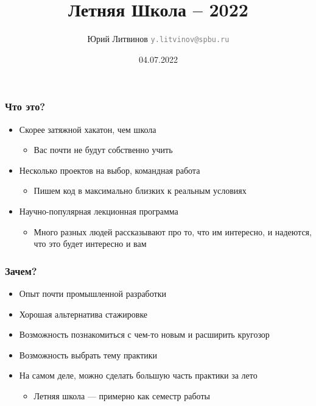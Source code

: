 \documentclass[xetex,mathserif,serif]{beamer}
\title{Летняя Школа -- 2022}
\author[Юрий Литвинов]{Юрий Литвинов \newline \textcolor{gray}{\small\texttt{y.litvinov@spbu.ru}}}
\date{04.07.2022}
\begin{document}
    \frame{\titlepage}

    \begin{frame}
        \frametitle{Что это?}
        \begin{itemize}
            \item Скорее затяжной хакатон, чем школа
            \begin{itemize}
                \item Вас почти не будут собственно учить
            \end{itemize}
            \item Несколько проектов на выбор, командная работа
            \begin{itemize}
                \item Пишем код в максимально близких к реальным условиях
            \end{itemize}
            \item Научно-популярная лекционная программа
            \begin{itemize}
                \item Много разных людей рассказывают про то, что им интересно, и надеются, что это будет интересно и вам
            \end{itemize}
        \end{itemize}
    \end{frame}

    \begin{frame}
        \frametitle{Зачем?}
        \begin{itemize}
            \item Опыт почти промышленной разработки
            \item Хорошая альтернатива стажировке
            \item Возможность познакомиться с чем-то новым и расширить кругозор
            \item Возможность выбрать тему практики
            \item На самом деле, можно сделать большую часть практики за лето
            \begin{itemize}
                \item Летняя школа --- примерно как семестр работы
            \end{itemize}
        \end{itemize}
    \end{frame}
\end{document}
